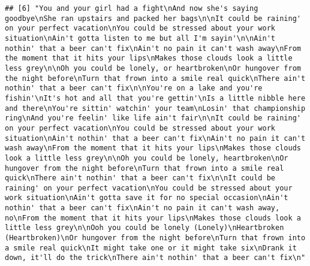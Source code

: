 \documentclass[]{article}
\newenvironment{Shaded}{\begin{snugshade}}{\end{snugshade}}
\newcommand{\KeywordTok}[1]{\textcolor[rgb]{0.13,0.29,0.53}{\textbf{#1}}}
\newcommand{\NormalTok}[1]{#1}
\newcommand{\OperatorTok}[1]{\textcolor[rgb]{0.81,0.36,0.00}{\textbf{#1}}}
\begin{document}
\begin{verbatim}
## [6] "You and your girl had a fight\nAnd now she's saying goodbye\nShe ran upstairs and packed her bags\n\nIt could be raining' on your perfect vacation\nYou could be stressed about your work situation\nAin't gotta listen to me but all I'm sayin'\n\nAin't nothin' that a beer can't fix\nAin't no pain it can't wash away\nFrom the moment that it hits your lips\nMakes those clouds look a little less grey\n\nOh you could be lonely, or heartbroken\nOr hungover from the night before\nTurn that frown into a smile real quick\nThere ain't nothin' that a beer can't fix\n\nYou're on a lake and you're fishin'\nIt's hot and all that you're gettin'\nIs a little nibble here and there\nYou're sittin' watchin' your team\nLosin' that championship ring\nAnd you're feelin' like life ain't fair\n\nIt could be raining' on your perfect vacation\nYou could be stressed about your work situation\nAin't nothin' that a beer can't fix\nAin't no pain it can't wash away\nFrom the moment that it hits your lips\nMakes those clouds look a little less grey\n\nOh you could be lonely, heartbroken\nOr hungover from the night before\nTurn that frown into a smile real quick\nThere ain't nothin' that a beer can't fix\n\nIt could be raining' on your perfect vacation\nYou could be stressed about your work situation\nAin't gotta save it for no special occasion\nAin't nothin' that a beer can't fix\nAin't no pain it can't wash away, no\nFrom the moment that it hits your lips\nMakes those clouds look a little less grey\n\nOoh you could be lonely (Lonely)\nHeartbroken (Heartbroken)\nOr hungover from the night before\nTurn that frown into a smile real quick\nIt might take one or it might take six\nDrank it down, it'll do the trick\nThere ain't nothin' that a beer can't fix\n"
\end{verbatim}

\begin{Shaded}
\end{Shaded}
\end{document}
